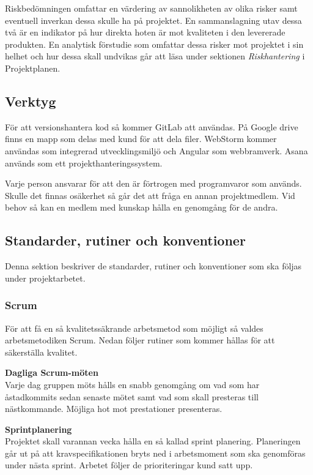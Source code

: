 \documentclass[a4paper,10pt]{article}
\begin{document}
Riskbedömningen omfattar en värdering av sannolikheten av olika risker samt eventuell inverkan dessa skulle ha på projektet. En sammanslagning utav dessa två är en indikator på hur direkta hoten är mot kvaliteten i den levererade produkten.
En analytisk förstudie som omfattar dessa risker mot projektet i sin helhet och hur dessa skall undvikas går att läsa under sektionen \emph{Riskhantering} i Projektplanen.

\subsection{Verktyg}
\label{sec:Verktyg}

För att versionshantera kod så kommer GitLab att användas. På Google drive finns en mapp som delas med kund för att dela filer. WebStorm kommer användas som integrerad utvecklingsmiljö och Angular som webbramverk. Asana används som ett projekthanteringssystem.

Varje person ansvarar för att den är förtrogen med programvaror som används. Skulle det finnas osäkerhet så går det att fråga en annan projektmedlem. Vid behov så kan en medlem med kunskap hålla en genomgång för de andra.

\subsection{Standarder, rutiner och konventioner}
Denna sektion beskriver de standarder, rutiner och konventioner som ska följas under projektarbetet.

\subsubsection{Scrum}
\label{sec:Scrum}
För att få en så kvalitetssäkrande arbetsmetod som möjligt så valdes arbetsmetodiken Scrum. Nedan följer rutiner som kommer hållas för att säkerställa kvalitet.

\textbf{Dagliga Scrum-möten}\\
Varje dag gruppen möts hålls en snabb genomgång om vad som har åstadkommits sedan senaste mötet samt vad som skall presteras till nästkommande. Möjliga hot mot prestationer presenteras.

\textbf{Sprintplanering}\\
Projektet skall varannan vecka hålla en så kallad sprint planering. Planeringen går ut på att kravspecifikationen bryts ned i arbetsmoment som ska genomföras under nästa sprint. Arbetet följer de prioriteringar kund satt upp.
\end{document}
